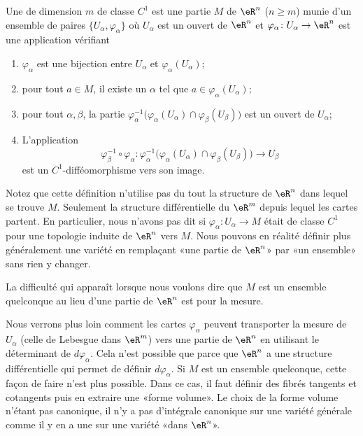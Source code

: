 \begin{definition}
    Une  de dimension \( m\) de classe \( C^1\) est une partie \( M\) de \( \eR^n\) (\( n\geq m\)) munie d'un ensemble de paires \( \{ U_{\alpha},\varphi_{\alpha} \}\) où \( U_{\alpha}\) est un ouvert de \( \eR^n\) et \( \varphi_{\alpha}\colon U_{\alpha}\to \eR^n\) est une application vérifiant
    \begin{enumerate}
        \item
            \( \varphi_{\alpha}\) est une bijection entre \( U_{\alpha}\) et \( \varphi_{\alpha}(U_{\alpha})\);
        \item
            pour tout \( a\in M\), il existe un \( \alpha\) tel que \( a\in\varphi_{\alpha}(U_{\alpha})\);
        \item
            pour tout \( \alpha,\beta\), la partie \( \varphi_{\alpha}^{-1}\big( \varphi_{\alpha}(U_{\alpha})\cap \varphi_{\beta}(U_{\beta}) \big)\) est un ouvert de \( U_{\alpha}\);
        \item
            L'application
            \begin{equation}
                \varphi_{\beta}^{-1}\circ \varphi_{\alpha}\colon \varphi_{\alpha}^{-1}\big( \varphi_{\alpha}(U_{\alpha})\cap \varphi_{\beta}(U_{\beta}) \big)\to U_{\beta}
            \end{equation}
            est un \( C^1\)-difféomorphisme vers son image.
    \end{enumerate}
\end{definition}

Notez que cette définition n'utilise pas du tout la structure de \( \eR^n\) dans lequel se trouve \( M\). Seulement la structure différentielle du \( \eR^m\) depuis lequel les cartes partent. En particulier, nous n'avons pas dit si \( \varphi_{\alpha}\colon U_{\alpha}\to M\) était de classe \( C^1\) pour une topologie induite de \( \eR^n\) vers \( M\). Nous pouvons en réalité définir plus généralement une variété en remplaçant «une partie de \( \eR^n\)» par «un ensemble» sans rien y changer.

La difficulté qui apparaît lorsque nous voulons dire que \( M\) est un ensemble quelconque au lieu d'une partie de \( \eR^n\) est pour la mesure.

Nous verrons plus loin comment les cartes \( \varphi_{\alpha}\) peuvent transporter la mesure de \( U_{\alpha}\) (celle de Lebesgue dans \( \eR^m\)) vers une partie de \( \eR^n\) en utilisant le déterminant de \( d\varphi_{\alpha}\). Cela n'est possible que parce que \( \eR^n\) a une structure différentielle qui permet de définir \( d\varphi_{\alpha}\). Si \( M\) est un ensemble quelconque, cette façon de faire n'est plus possible. Dans ce cas, il faut définir des fibrés tangents et cotangents puis en extraire une «forme volume». Le choix de la forme volume n'étant pas canonique, il n'y a pas d'intégrale canonique sur une variété générale comme il y en a une sur une variété «dans \( \eR^n\)».

